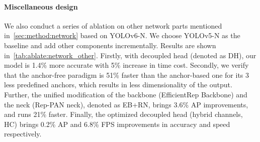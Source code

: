 \documentclass[10pt,twocolumn,letterpaper]{article}
\begin{document}
  \paragraph{Miscellaneous design}
  We also conduct a series of ablation on other network parts mentioned in~\cref{sec:method:network} based on YOLOv6-N. We choose YOLOv5-N as the baseline and add other components incrementally. Results are shown in~\cref{tab:ablate:network_other}. Firstly, with decoupled head (denoted as DH), our model is 1.4\% more accurate with 5\% increase in time cost. Secondly, we verify that the anchor-free paradigm is 51\% faster than the anchor-based one for its 3 less predefined anchors, which results in less dimensionality of the output. Further, the unified modification of the backbone (EfficientRep Backbone) and the neck (Rep-PAN neck), denoted as EB+RN, brings 3.6\% AP improvements, and runs 21\% faster. Finally, the optimized decoupled head (hybrid channels, HC) brings 0.2\% AP and 6.8\% FPS improvements in accuracy and speed respectively.

  \begin{table}
    \centering
    \caption{Ablation study on all network designs in an incremental way. FPS is tested with FP16-precision and batch-size=32 on Tesla T4 GPUs.}
    \label{tab:ablate:network_other}
  \end{table}
\end{document}
